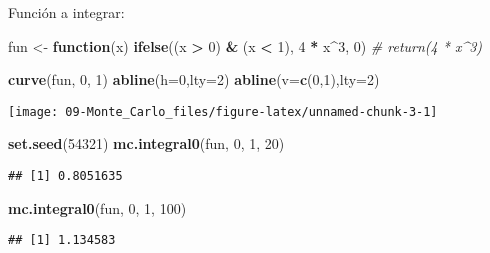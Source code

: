 \documentclass[
]{book}
\newenvironment{Shaded}{\begin{snugshade}}{\end{snugshade}}
\newcommand{\CommentTok}[1]{\textcolor[rgb]{0.56,0.35,0.01}{\textit{#1}}}
\newcommand{\ControlFlowTok}[1]{\textcolor[rgb]{0.13,0.29,0.53}{\textbf{#1}}}
\newcommand{\DataTypeTok}[1]{\textcolor[rgb]{0.13,0.29,0.53}{#1}}
\newcommand{\DecValTok}[1]{\textcolor[rgb]{0.00,0.00,0.81}{#1}}
\newcommand{\KeywordTok}[1]{\textcolor[rgb]{0.13,0.29,0.53}{\textbf{#1}}}
\newcommand{\NormalTok}[1]{#1}
\newcommand{\OperatorTok}[1]{\textcolor[rgb]{0.81,0.36,0.00}{\textbf{#1}}}
\newcommand{\StringTok}[1]{\textcolor[rgb]{0.31,0.60,0.02}{#1}}
\theoremstyle{break}
\theoremstyle{definition}
\theoremstyle{definition}
\theoremstyle{definition}
\theoremstyle{remark}
\begin{document}
Función a integrar:

\begin{Shaded}
\begin{Highlighting}[]
\NormalTok{fun <-}\StringTok{ }\ControlFlowTok{function}\NormalTok{(x) }\KeywordTok{ifelse}\NormalTok{((x }\OperatorTok{>}\StringTok{ }\DecValTok{0}\NormalTok{) }\OperatorTok{&}\StringTok{ }\NormalTok{(x }\OperatorTok{<}\StringTok{ }\DecValTok{1}\NormalTok{), }\DecValTok{4} \OperatorTok{*}\StringTok{ }\NormalTok{x}\OperatorTok{^}\DecValTok{3}\NormalTok{, }\DecValTok{0}\NormalTok{)}
\CommentTok{# return(4 * x^3)}

\KeywordTok{curve}\NormalTok{(fun, }\DecValTok{0}\NormalTok{, }\DecValTok{1}\NormalTok{)}
\KeywordTok{abline}\NormalTok{(}\DataTypeTok{h=}\DecValTok{0}\NormalTok{,}\DataTypeTok{lty=}\DecValTok{2}\NormalTok{)}
\KeywordTok{abline}\NormalTok{(}\DataTypeTok{v=}\KeywordTok{c}\NormalTok{(}\DecValTok{0}\NormalTok{,}\DecValTok{1}\NormalTok{),}\DataTypeTok{lty=}\DecValTok{2}\NormalTok{)}
\end{Highlighting}
\end{Shaded}

\begin{center}\texttt{[image: 09-Monte\_Carlo\_files/figure-latex/unnamed-chunk-3-1]} \end{center}

\begin{Shaded}
\begin{Highlighting}[]
\KeywordTok{set.seed}\NormalTok{(}\DecValTok{54321}\NormalTok{)}
\KeywordTok{mc.integral0}\NormalTok{(fun, }\DecValTok{0}\NormalTok{, }\DecValTok{1}\NormalTok{, }\DecValTok{20}\NormalTok{)}
\end{Highlighting}
\end{Shaded}

\begin{verbatim}
## [1] 0.8051635
\end{verbatim}

\begin{Shaded}
\begin{Highlighting}[]
\KeywordTok{mc.integral0}\NormalTok{(fun, }\DecValTok{0}\NormalTok{, }\DecValTok{1}\NormalTok{, }\DecValTok{100}\NormalTok{)}
\end{Highlighting}
\end{Shaded}

\begin{verbatim}
## [1] 1.134583
\end{verbatim}
\end{document}
